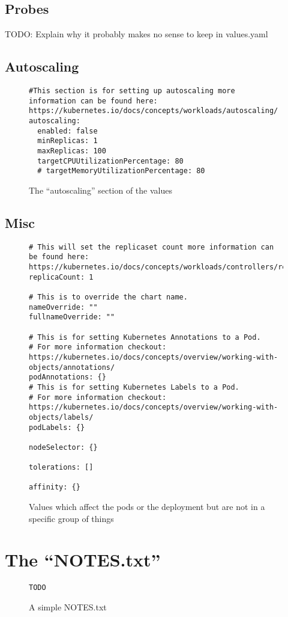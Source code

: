 \subsection{Probes}

TODO: Explain why it probably makes no sense to keep in values.yaml

\lipsum[2-4] 
\clearpage

\subsection{Autoscaling}
\lipsum[2-4] 

\begin{figure}[h]
\begin{verbatim}
#This section is for setting up autoscaling more information can be found here: https://kubernetes.io/docs/concepts/workloads/autoscaling/
autoscaling:
  enabled: false
  minReplicas: 1
  maxReplicas: 100
  targetCPUUtilizationPercentage: 80
  # targetMemoryUtilizationPercentage: 80
\end{verbatim}
\caption{The \enquote{autoscaling} section of the \gls{values}}\label{code:autoscaling_section}
\end{figure}
\clearpage

\subsection{Misc}
\lipsum[2-4] 

\begin{figure}[h]
\begin{verbatim}
# This will set the replicaset count more information can be found here: https://kubernetes.io/docs/concepts/workloads/controllers/replicaset/
replicaCount: 1

# This is to override the chart name.
nameOverride: ""
fullnameOverride: ""

# This is for setting Kubernetes Annotations to a Pod.
# For more information checkout: https://kubernetes.io/docs/concepts/overview/working-with-objects/annotations/ 
podAnnotations: {}
# This is for setting Kubernetes Labels to a Pod.
# For more information checkout: https://kubernetes.io/docs/concepts/overview/working-with-objects/labels/
podLabels: {}

nodeSelector: {}

tolerations: []

affinity: {}
\end{verbatim}
\caption{Values which affect the pods or the deployment but are not in a specific group of things}\label{code:misc_values}
\end{figure}
\clearpage

\section{The \enquote{NOTES.txt}}
\lipsum[2-4] 

\begin{figure}[h]
\begin{verbatim}
TODO
\end{verbatim}
\caption{A simple NOTES.txt}\label{code:NOTES.txt}
\end{figure}
\clearpage